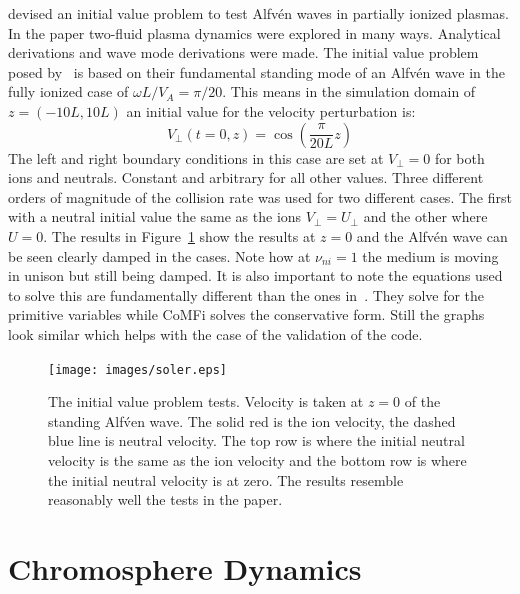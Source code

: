 \documentclass[12pt,upcase]{umlthesis}
\begin{document}
\citet{Soler2013} devised an initial value problem to test Alfv\'en waves in partially ionized plasmas. In the paper two-fluid plasma dynamics were explored in many ways. Analytical derivations and wave mode derivations were made. The initial value problem posed by~\citet{Soler2013} is based on their fundamental standing mode of an Alfv\'en wave in the fully ionized case of $\omega L / V_A = \pi / 20$. This means in the simulation domain of $z = (-10L,10L)$ an initial value for the velocity perturbation is:
\begin{equation}\label{eq:solerintial}
	V_{\perp}(t=0,z) = \cos{(\frac{\pi}{20 L} z)}
\end{equation}
The left and right boundary conditions in this case are set at $V_{\perp} = 0$ for both ions and neutrals. Constant and arbitrary for all other values. Three different orders of magnitude of the collision rate was used for two different cases. The first with a neutral initial value the same as the ions $V_{\perp} = U_{\perp}$ and the other where $U=0$. The results in Figure~\ref{fig:soler} show the results at $z=0$ and the Alfv\'en wave can be seen clearly damped in the cases. Note how at $\nu_{ni}=1$ the medium is moving in unison but still being damped. It is also important to note the equations used to solve this are fundamentally different than the ones in~\citet{Soler2013}. They solve for the primitive variables while CoMFi solves the conservative form. Still the graphs look similar which helps with the case of the validation of the code.

\begin{figure}[ht!]
	\texttt{[image: images/soler.eps]}
	\caption{The \citet{Soler2013} initial value problem tests. Velocity is taken at $z=0$ of the standing Alf\'ven wave. The solid red is the ion velocity, the dashed blue line is neutral velocity. The top row is where the initial neutral velocity is the same as the ion velocity and the bottom row is where the initial neutral velocity is at zero. The results resemble reasonably well the tests in the \citet{Soler2013} paper.}\label{fig:soler}
\end{figure}

\chapter{Chromosphere Dynamics}\label{chap:chromosphere} 
\end{document}
